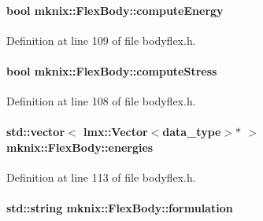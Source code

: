 \paragraph[{compute\+Energy}]{\setlength{\rightskip}{0pt plus 5cm}bool mknix\+::\+Flex\+Body\+::compute\+Energy\hspace{0.3cm}{\ttfamily [protected]}}\label{classmknix_1_1_flex_body_a653efdbfbf4f6ec147407a1c7ffb3779}


Definition at line 109 of file bodyflex.\+h.

\hypertarget{classmknix_1_1_flex_body_aaacb11b0809c01edca2c7ef4ea41de7a}{}
\paragraph[{compute\+Stress}]{\setlength{\rightskip}{0pt plus 5cm}bool mknix\+::\+Flex\+Body\+::compute\+Stress\hspace{0.3cm}{\ttfamily [protected]}}\label{classmknix_1_1_flex_body_aaacb11b0809c01edca2c7ef4ea41de7a}


Definition at line 108 of file bodyflex.\+h.

\hypertarget{classmknix_1_1_flex_body_a1e6af3de339ebfd54b79e11827121622}{}
\paragraph[{energies}]{\setlength{\rightskip}{0pt plus 5cm}std\+::vector$<$ {\bf lmx\+::\+Vector}$<${\bf data\+\_\+type}$>$$\ast$ $>$ mknix\+::\+Flex\+Body\+::energies\hspace{0.3cm}{\ttfamily [protected]}}\label{classmknix_1_1_flex_body_a1e6af3de339ebfd54b79e11827121622}


Definition at line 113 of file bodyflex.\+h.

\hypertarget{classmknix_1_1_flex_body_acb6f1ed2a9f207ceb39d485aabc2fbcf}{}
\paragraph[{formulation}]{\setlength{\rightskip}{0pt plus 5cm}std\+::string mknix\+::\+Flex\+Body\+::formulation\hspace{0.3cm}{\ttfamily [protected]}}\label{classmknix_1_1_flex_body_acb6f1ed2a9f207ceb39d485aabc2fbcf}


